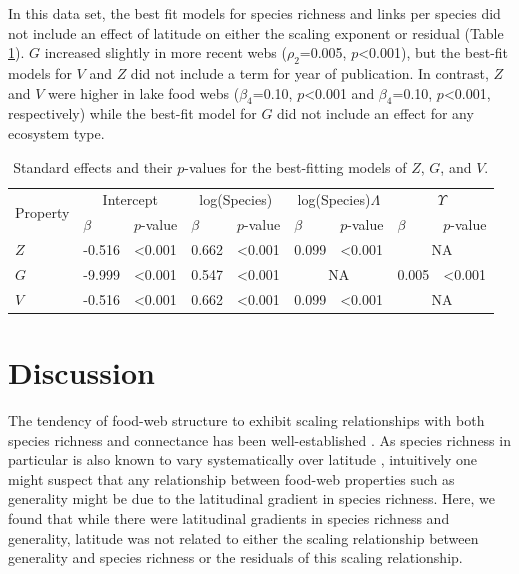 \documentclass[12pt]{article}
\begin{document}
In this data set, the best fit models for species richness and links per species did not include an 
effect of latitude on either the scaling exponent or residual (Table \ref{Bestfits}). 
$G$ increased slightly in more recent webs ($\rho_{2}$=0.005, $p$\textless0.001), but the best-fit models for $V$ and $Z$ did not include a term for year of publication. 
In contrast, $Z$ and $V$ were higher in lake food webs ($\beta_{4}$=0.10, $p$\textless0.001 and $\beta_{4}$=0.10, $p$\textless0.001, respectively) while the best-fit model for $G$ did not include an effect for any ecosystem type.

\begin{table}[!h]

\caption{Standard effects and their $p$-values for the best-fitting models of $Z$, $G$, and $V$.}
\label{Bestfits}
\begin{tabular}{l | l l | l l | l l | l l }
\multirow{2}{*}{Property} & \multicolumn{2}{c}{Intercept} & \multicolumn{2}{c}{log(Species)} & \multicolumn{2}{c}{log(Species)$\Lambda$} & \multicolumn{2}{c}{$\Upsilon$} \\
& $\beta$ & $p$-value &  $\beta$ & $p$-value &  $\beta$ & $p$-value &  $\beta$ & $p$-value  \\
\hline
$Z$ & -0.516 & \textless0.001 & 0.662 & \textless0.001 & 0.099 & \textless0.001 & \multicolumn{2}{c}{NA} \\
$G$ & -9.999 & \textless0.001 & 0.547 & \textless0.001 & \multicolumn{2}{c|}{NA} & 0.005 & \textless0.001 \\
$V$ & -0.516 & \textless0.001 & 0.662 & \textless0.001 & 0.099 & \textless0.001 & \multicolumn{2}{c}{NA} \\
\end{tabular}
\end{table}


\section*{Discussion}

The tendency of food-web structure to exhibit scaling relationships with both
species richness and connectance has been  well-established \citep{}. As
species richness in particular is also known to vary systematically over
latitude \citep{}, intuitively one might suspect that any relationship
between food-web properties such as generality might be due to the latitudinal
gradient in species richness. Here, we found that while there were latitudinal
gradients in species richness and generality, latitude was not related to
either the scaling relationship between generality and species richness or the
residuals of this scaling relationship.
\end{document}
